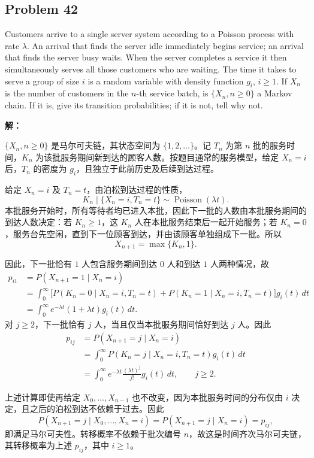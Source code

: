 \documentclass[12pt,a4paper]{article}
\begin{document}
\subsection{Problem 42}

Customers arrive to a single server system according to a Poisson process with rate $\lambda$. An arrival that finds the server idle immediately begins service; an arrival that finds the server busy waits. When the server completes a service it then simultaneously serves all those customers who are waiting. The time it takes to serve a group of size $i$ is a random variable with density function $g_i$, $i \ge 1$. If $X_n$ is the number of customers in the $n$-th service batch, is $\{X_n, n \ge 0\}$ a Markov chain. If it is, give its transition probabilities; if it is not, tell why not.

\begin{answerbox}
\textbf{解：}

$\{X_n,n\geq0\}$ 是马尔可夫链，其状态空间为 $\{1,2,\ldots\}$。记 $T_n$ 为第 $n$ 批的服务时间，$K_n$ 为该批服务期间新到达的顾客人数。按题目通常的服务模型，给定 $X_n=i$ 后，$T_n$ 的密度为 $g_i$，且独立于此前历史及后续到达过程。

给定 $X_n=i$ 及 $T_n=t$，由泊松到达过程的性质，
$$
K_n\mid\{X_n=i,T_n=t\}
\sim\operatorname{Poisson}(\lambda t).
$$
本批服务开始时，所有等待者均已进入本批，因此下一批的人数由本批服务期间的到达人数决定：若 $K_n\geq1$，这 $K_n$ 人在本批服务结束后一起开始服务；若 $K_n=0$，服务台先空闲，直到下一位顾客到达，并由该顾客单独组成下一批。所以
$$
X_{n+1}=\max\{K_n,1\}.
$$

因此，下一批恰有 $1$ 人包含服务期间到达 $0$ 人和到达 $1$ 人两种情况，故
$$
\begin{aligned}
p_{i1}
&=P(X_{n+1}=1\mid X_n=i)\\
&=\int_0^\infty
\bigl[P(K_n=0\mid X_n=i,T_n=t)
+P(K_n=1\mid X_n=i,T_n=t)\bigr]g_i(t)\,dt\\
&=\int_0^\infty e^{-\lambda t}(1+\lambda t)g_i(t)\,dt.
\end{aligned}
$$
对 $j\geq2$，下一批恰有 $j$ 人，当且仅当本批服务期间恰好到达 $j$ 人。因此
$$
\begin{aligned}
p_{ij}
&=P(X_{n+1}=j\mid X_n=i)\\
&=\int_0^\infty
P(K_n=j\mid X_n=i,T_n=t)g_i(t)\,dt\\
&=\int_0^\infty e^{-\lambda t}
\frac{(\lambda t)^j}{j!}g_i(t)\,dt,
\qquad j\geq2.
\end{aligned}
$$

上述计算即使再给定 $X_0,\ldots,X_{n-1}$ 也不改变，因为本批服务时间的分布仅由 $i$ 决定，且之后的泊松到达不依赖于过去。因此
$$
P(X_{n+1}=j\mid X_0,\ldots,X_n=i)
=P(X_{n+1}=j\mid X_n=i)=p_{ij},
$$
即满足马尔可夫性。转移概率不依赖于批次编号 $n$，故这是时间齐次马尔可夫链，其转移概率为上述 $p_{ij}$，其中 $i\geq1$。
\end{answerbox}
\end{document}
